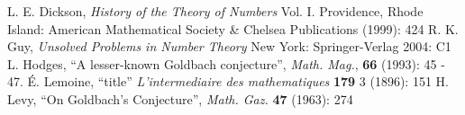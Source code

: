 \documentclass[12pt]{article}
\begin{document}
\begin{thebibliography}{3}
 L. E. Dickson, {\it History of the Theory of Numbers} Vol. I. 
Providence, Rhode Island: American Mathematical Society \& Chelsea 
Publications (1999): 424
 R. K. Guy, {\it Unsolved Problems in Number Theory} New York: 
Springer-Verlag 2004: C1
 L. Hodges, ``A lesser-known Goldbach conjecture'', 
{\it Math. Mag.}, {\bf 66} (1993): 45 - 47. 
 \'E. Lemoine, ``title'' {\it L'intermediaire des mathematiques}
 {\bf 179} 3 (1896): 151
 H. Levy, ``On Goldbach's Conjecture'', {\it Math. Gaz.} {\bf 47} 
(1963): 274
\end{thebibliography}
\end{document}
